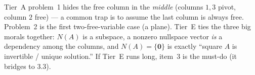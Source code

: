 \documentclass[10pt]{article}
\newcommand{\zero}{\mathbf{0}}
\begin{document}
\begin{teachernote}
Tier~A problem~1 hides the free column in the \emph{middle} (columns $1,3$ pivot, column $2$ free) --- a
common trap is to assume the last column is always free. Problem~2 is the first two-free-variable case
(a plane). Tier~E ties the three big morals together: $N(A)$ is a subspace, a nonzero nullspace vector
\emph{is} a dependency among the columns, and $N(A)=\{\zero\}$ is exactly ``square $A$ is invertible /
unique solution.'' If Tier~E runs long, item~3 is the must-do (it bridges to 3.3).
\end{teachernote}
\end{document}
